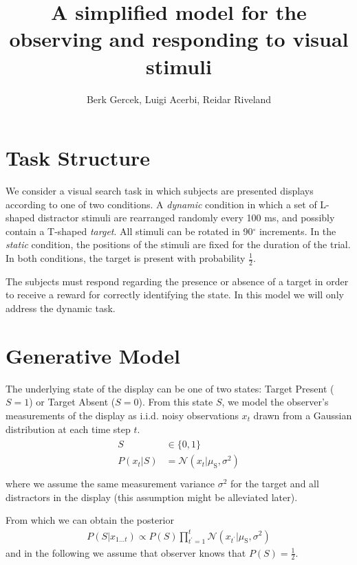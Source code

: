 \documentclass[12pt]{article}
\newcommand{\mus}{\mu_\text{S}}
\begin{document}
\title{A simplified model for the observing and responding to visual stimuli}
\author{Berk Gercek, Luigi Acerbi, Reidar Riveland}
\maketitle
\section{Task Structure}
We consider a visual search task in which subjects are presented displays according to one of two conditions. A \emph{dynamic} condition in which a set of L-shaped distractor stimuli are rearranged randomly every 100 ms, and possibly contain a T-shaped \emph{target}. All stimuli can be rotated in 90$^\circ$ increments. In the \emph{static} condition, the positions of the stimuli are fixed for the duration of the trial.
In both conditions, the target is present with probability $\frac{1}{2}$.

The subjects must respond regarding the presence or absence of a target in order to receive a reward for correctly identifying the state. In this model we will only address the dynamic task.

\section{Generative Model}
The underlying state of the display can be one of two states: Target Present ($S=1$) or Target Absent ($S=0$). From this state $S$, we model the observer's measurements of the display as i.i.d. noisy observations $x_t$ drawn from a Gaussian distribution at each time step $t$.
\begin{align}
\begin{split}
S &\in \{0, 1\} \\
P(x_t | S) &= \mathcal{N}(x_t | \mus, \sigma^2)\\
\end{split}
\end{align}
where we assume the same measurement variance $\sigma^2$ for the target and all distractors in the display (this assumption might be alleviated later).

From which we can obtain the posterior
\begin{align}
P(S | x_{1 \dots t}) \propto P(S) \prod_{t^\prime=1}^t \mathcal{N}(x_{t^\prime} | \mus, \sigma^2)
\end{align}
and in the following we assume that observer knows that $P(S) = \frac{1}{2}$.
\end{document}
